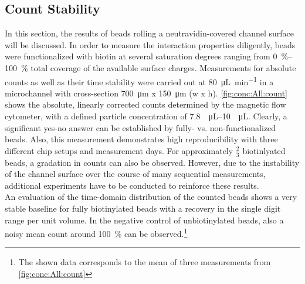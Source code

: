 \subsection{Count Stability}
In this section, the results of beads rolling a neutravidin-covered channel surface will be discussed. In order to measure the interaction properties diligently, beads were functionalized with biotin at several saturation degrees ranging from \SIrange{0}{100}{\percent} total coverage of the available surface charges. Measurements for absolute counts as well as their time stability were carried out at \SI{80}{\micro\liter\per\minute} in a microchannel with cross-section \SI{700}{\micro\meter} x \SI{150}{\micro\meter}  (w x h). \cref{fig:conc:All:count} shows the absolute, linearly corrected counts determined by the magnetic flow cytometer, with a defined particle concentration of \SIrange{7.8}{10}{\per\micro\liter}. Clearly, a significant yes-no answer can be established by fully- vs. non-functionalized beads. Also, this measurement demonstrates high reproducibility with three different chip setups and measurement days. For approximately $\frac{2}{3}$ biotinlyated beads, a gradation in counts can also be observed. However, due to the instability of the channel surface over the course of many sequential measurements, additional experiments have to be conducted to reinforce these results. \\
An evaluation of the time-domain distribution of the counted beads shows a very stable baseline for fully biotinylated beads with a recovery in the single digit range per unit volume. In the negative control of unbiotinylated beads, also a noisy mean count around \SI{100}{\percent} can be observed.\footnote{The shown data corresponds to the mean of three measurements from \cref{fig:conc:All:count}}
\begin{figure}[!h]
	\centering
	 \hfill
	\addtocounter{subfigure}{-1}
	\label{fig:conc:All}
\end{figure}

